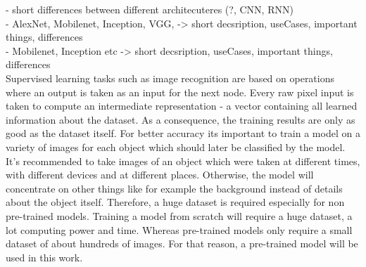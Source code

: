 		- short differences between different architecuteres (?, CNN, RNN) \\
 		- AlexNet, Mobilenet, Inception, VGG, -> short decsription, useCases, important things, differences \\
 		- Mobilenet, Inception etc -> short decsription, useCases, important things, differences \\
 		
Supervised learning tasks such as image recognition are based on operations where an output is taken as an input for the next node. Every raw pixel input is taken to compute an intermediate representation - a vector containing all learned information about the dataset. As a consequence, the training results are only as good as the dataset itself. For better accuracy its important to train a model on a variety of images for each object which should later be classified by the model. It's recommended to take images of an object which were taken at different times, with different devices and at different places. Otherwise, the model will concentrate on other things like for example the background instead of details about the object itself. Therefore, a huge dataset is required especially for non pre-trained models. Training a model from scratch will require a huge dataset, a lot computing power and time. Whereas pre-trained models only require a small dataset of about hundreds of images. For that reason, a pre-trained model will be used in this work.